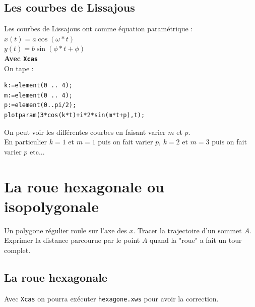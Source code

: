 \documentclass[a4paper,11pt]{book}
\begin{document}
\section{Les courbes de Lissajous}
Les courbes de Lissajous ont comme \'equation param\'etrique  :\\
$x(t)=a\cos(\omega* t)$\\
$y(t)=b\sin(\phi* t+\phi)$\\
{\bf Avec {\tt Xcas}}\\
On tape :
\begin{verbatim}
k:=element(0 .. 4);
m:=element(0 .. 4);
p:=element(0..pi/2);
plotparam(3*cos(k*t)+i*2*sin(m*t+p),t);
\end{verbatim}
On peut voir les diff\'erentes courbes en faisant varier $m$ et $p$.\\
En particulier $k=1$ et $m=1$ puis on fait varier $p$,
$k=2$ et $m=3$ puis on fait varier $p$ etc... 

\chapter{La roue hexagonale ou isopolygonale}
Un polygone r\'egulier roule sur l'axe des $x$.
Tracer la trajectoire d'un sommet $A$.\\
Exprimer la distance parcourue par le 
point $A$ quand la "roue" a fait un tour complet.
\section{La roue hexagonale}
Avec {\tt Xcas} on pourra ex\'ecuter {\tt hexagone.xws} pour avoir la 
correction.
\end{document}
